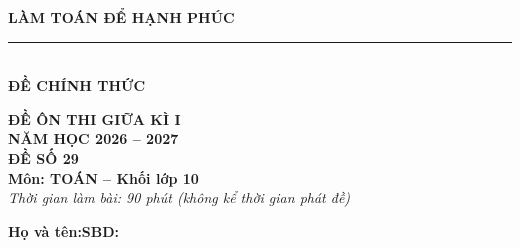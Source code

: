 \documentclass[12pt,a4paper]{article}
\begin{document}
\noindent
\begin{minipage}[c]{0.38\textwidth}
    \centering
    \textbf{LÀM TOÁN ĐỂ HẠNH PHÚC}\\[-2pt]
    \rule{3.2cm}{0.6pt}\\[3pt]
    \textbf{ĐỀ CHÍNH THỨC}
\end{minipage}\hfill
\begin{minipage}[c]{0.35\textwidth}
    \centering
    \textbf{ĐỀ ÔN THI GIỮA KÌ I}\\
    \textbf{NĂM HỌC 2026 -- 2027}\\[2pt]
    \textbf{ĐỀ SỐ 29}\\
    \textbf{Môn: TOÁN -- Khối lớp 10}\\
    \textit{\small Thời gian làm bài: 90 phút (không kể thời gian phát đề)}
\end{minipage}

\vspace{0.03cm}
\noindent
\begin{minipage}[b]{0.78\textwidth}
    \textbf{Họ và tên:}\dotfill\textbf{SBD:}\makebox[3.5cm]{\dotfill}
\end{minipage}\hfill
\begin{minipage}[b]{0.20\textwidth}
    \hfill
    \setlength{\fboxrule}{0.8pt}%
\end{minipage}
\vspace{0.03cm}
\end{document}
